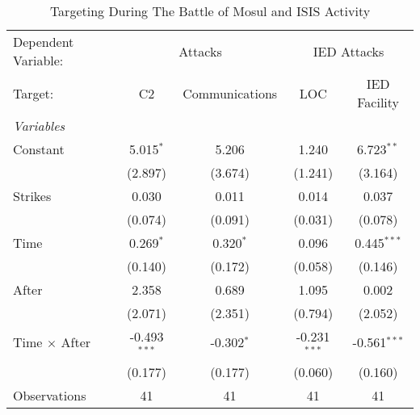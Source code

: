 \begin{table}[htbp]
    \caption{Targeting During The Battle of Mosul and ISIS Activity}
    \centering
    \begin{tabular}{lcccc}
       \tabularnewline \midrule \midrule
       Dependent Variable: & \multicolumn{2}{c}{Attacks} & \multicolumn{2}{c}{IED Attacks}\\
       Target:               & C2             & Communications           & LOC             & IED Facility \\
       \midrule
       \emph{Variables}\\
       Constant             & 5.015$^{*}$     & 5.206         & 1.240           & 6.723$^{**}$\\
                            & (2.897)         & (3.674)       & (1.241)         & (3.164)\\
       Strikes              & 0.030          & 0.011        & 0.014          & 0.037\\   
                            & (0.074)        & (0.091)      & (0.031)        & (0.078)\\
       Time                 & 0.269$^{*}$    & 0.320$^{*}$  & 0.096          & 0.445$^{***}$\\
                            & (0.140)        & (0.172)      & (0.058)        & (0.146)\\
       After                & 2.358           & 0.689        & 1.095           & 0.002\\
                            & (2.071)         & (2.351)       & (0.794)        & (2.052)\\
       Time $\times$ After  & -0.493$^{***}$ & -0.302$^{*}$ & -0.231$^{***}$ & -0.561$^{***}$\\
                            & (0.177)        & (0.177)      & (0.060)        & (0.160)\\
       \midrule
       Observations         & 41              & 41            & 41              & 41\\
       \midrule
    \end{tabular}
\end{table}

